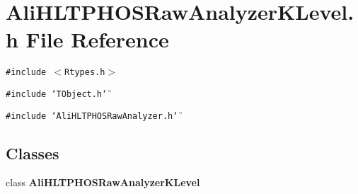 \section{Ali\-HLTPHOSRaw\-Analyzer\-KLevel.h File Reference}
\label{AliHLTPHOSRawAnalyzerKLevel_8h}


{\tt \#include $<$Rtypes.h$>$}\par
{\tt \#include \char`\"{}TObject.h\char`\"{}}\par
{\tt \#include \char`\"{}Ali\-HLTPHOSRaw\-Analyzer.h\char`\"{}}\par
\subsection*{Classes}
\begin{CompactItemize}
\item 
class {\bf Ali\-HLTPHOSRaw\-Analyzer\-KLevel}
\end{CompactItemize}
